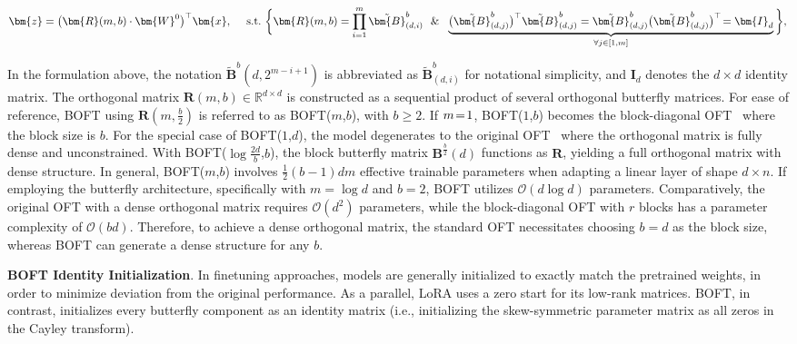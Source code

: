 \begin{equation}
    \begin{aligned}\nonumber
    \bm{z}=\big(\bm{R}(m,b)\cdot\bm{W}^0\big)^\top\bm{x},~~~~\text{s.t.}~\bigg{\{}\bm{R}(m,b)=\prod_{i=1}^m \tilde{\bm{B}}^b_{(d,i)}~~\&~~\underbrace{\big(\tilde{\bm{B}}^b_{(d,j)}\big)^\top\tilde{\bm{B}}^b_{(d,j)}=\tilde{\bm{B}}^b_{(d,j)}\big(\tilde{\bm{B}}^b_{(d,j)}\big)^\top\!=\bm{I}_d}_{\forall j\in [1, m]}\bigg{\}},
    \end{aligned}
\end{equation}

In the formulation above, the notation $\tilde{\bm{B}}^b(d,2^{m - i+1})$ is abbreviated as $\tilde{\bm{B}}^b_{(d,i)}$ for notational simplicity, and $\bm{I}_d$ denotes the $d \times d$ identity matrix. The orthogonal matrix $\bm{R}(m,b)\in\mathbb{R}^{d\times d}$ is constructed as a sequential product of several orthogonal butterfly matrices. For ease of reference, BOFT using $\bm{R}(m,\frac{b}{2})$ is referred to as BOFT($m$,$b$), with $b\geq 2$. If $\thickmuskip=2mu \medmuskip=2mu m=1$, BOFT($1$,$b$) becomes the block-diagonal OFT~\cite{qiu2023controlling} where the block size is $b$. For the special case of BOFT($1$,$d$), the model degenerates to the original OFT~\cite{qiu2023controlling} where the orthogonal matrix is fully dense and unconstrained. With BOFT($\log \frac{2d}{b}$,$b$), the block butterfly matrix $\bm{B}^{\frac{b}{2}}(d)$ functions as $\bm{R}$, yielding a full orthogonal matrix with dense structure. In general, BOFT($m$,$b$) involves $\frac{1}{2}(b-1)dm$ effective trainable parameters when adapting a linear layer of shape $d\times n$. If employing the butterfly architecture, specifically with $m=\log d$ and $b=2$, BOFT utilizes $\mathcal{O}(d\log d)$ parameters. Comparatively, the original OFT with a dense orthogonal matrix requires $\mathcal{O}(d^2)$ parameters, while the block-diagonal OFT with $r$ blocks has a parameter complexity of $\mathcal{O}(bd)$. Therefore, to achieve a dense orthogonal matrix, the standard OFT necessitates choosing $b=d$ as the block size, whereas BOFT can generate a dense structure for any $b$.

\textbf{BOFT Identity Initialization}. In finetuning approaches, models are generally initialized to exactly match the pretrained weights, in order to minimize deviation from the original performance. As a parallel, LoRA uses a zero start for its low-rank matrices. BOFT, in contrast, initializes every butterfly component as an identity matrix (i.e., initializing the skew-symmetric parameter matrix as all zeros in the Cayley transform).

